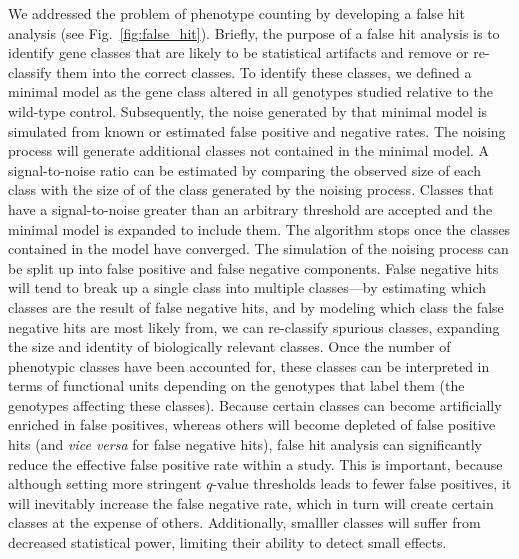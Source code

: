 \documentclass[10pt, twocolumn]{article}
\begin{document}
We addressed the problem of phenotype counting by developing a false hit
analysis (see Fig.~\ref{fig:false_hit}). Briefly, the purpose of a false hit
analysis is to identify gene classes that are likely to be statistical artifacts
and remove or re-classify them into the correct classes. To identify these
classes, we defined a minimal model as the gene class altered in all genotypes
studied relative to the wild-type control. Subsequently, the noise generated by
that minimal model is simulated from known or estimated false positive and
negative rates. The noising process will generate additional classes not
contained in the minimal model. A signal-to-noise ratio can be estimated by
comparing the observed size of each class with the size of of the class
generated by the noising process. Classes that have a signal-to-noise greater
than an arbitrary threshold are accepted and the minimal model is expanded to
include them. The algorithm stops once the classes contained in the model have
converged. The simulation of the noising process can be split up into false
positive and false negative components. False negative hits will tend to break
up a single class into multiple classes---by estimating which classes are the
result of false negative hits, and by modeling which class the false negative
hits are most likely from, we can re-classify spurious classes, expanding the
size and identity of biologically relevant classes. Once the number of
phenotypic classes have been accounted for, these classes can be interpreted in
terms of functional units depending on the genotypes that label them (the
genotypes affecting these classes). Because certain classes can become
artificially enriched in false positives, whereas others will become depleted of
false positive hits (and \emph{vice versa} for false negative hits), false hit
analysis can significantly reduce the effective false positive rate within a
study. This is important, because although setting more stringent $q$-value
thresholds leads to fewer false positives, it will inevitably increase the false
negative rate, which in turn will create certain classes at the expense of
others. Additionally, smalller classes will suffer from decreased statistical
power, limiting their ability to detect small effects.
\end{document}
